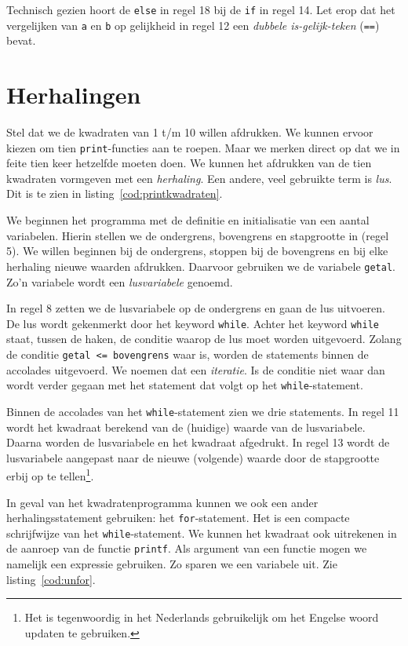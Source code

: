 Technisch gezien hoort de \texttt{else} in regel 18 bij de \texttt{if} in regel 14. Let erop dat het vergelijken van \texttt{a} en \texttt{b} op gelijkheid in regel 12 een \textsl{dubbele is-gelijk-teken} (\texttt{==})\indexop{==} bevat.

 
\section{Herhalingen}
Stel dat we de kwadraten van 1 t/m 10 willen afdrukken. We kunnen ervoor kiezen om tien \texttt{print}-functies aan te roepen. Maar we merken direct op dat we in feite tien keer hetzelfde moeten doen. We kunnen het afdrukken van de tien kwadraten vormgeven met een \textsl{herhaling}. Een andere, veel gebruikte term is \textsl{lus}. Dit is te zien in listing~\ref{cod:printkwadraten}.


We beginnen het programma met de definitie en initialisatie van een aantal variabelen. Hierin stellen we de ondergrens, bovengrens en stapgrootte in (regel 5). We willen beginnen bij de ondergrens, stoppen bij de bovengrens en bij elke herhaling nieuwe waarden afdrukken. Daarvoor gebruiken we de variabele \texttt{getal}. Zo'n variabele wordt een \textsl{lusvariabele} genoemd.

In regel 8 zetten we de lusvariabele op de ondergrens en gaan de lus uitvoeren. De lus wordt gekenmerkt door het keyword \texttt{while}. Achter het keyword \texttt{while} staat, tussen de haken, de conditie waarop de lus moet worden uitgevoerd.
Zolang de conditie \mbox{\texttt{getal <= bovengrens}} waar is, worden de statements binnen de accolades uitgevoerd. We noemen dat een \textsl{iteratie}. Is de conditie niet waar dan wordt verder gegaan met het statement dat volgt op het \texttt{while}-statement.

Binnen de accolades van het \texttt{while}-statement zien we drie statements. In regel 11 wordt het kwadraat berekend van de (huidige) waarde van de lusvariabele. Daarna worden de lusvariabele en het kwadraat afgedrukt. In regel 13 wordt de lusvariabele aangepast naar de nieuwe (volgende) waarde door de stapgrootte erbij op te tellen\footnote{Het is tegenwoordig in het Nederlands gebruikelijk om het Engelse woord updaten te gebruiken.}.

In geval van het kwadratenprogramma kunnen we ook een ander herhalingsstatement gebruiken: het \texttt{for}-statement. Het is een compacte schrijfwijze van het \texttt{while}-statement. We kunnen het kwadraat ook uitrekenen in de aanroep van de functie \texttt{printf}. Als argument van een functie mogen we namelijk een expressie gebruiken. Zo sparen we een variabele uit. Zie listing~\ref{cod:unfor}.

